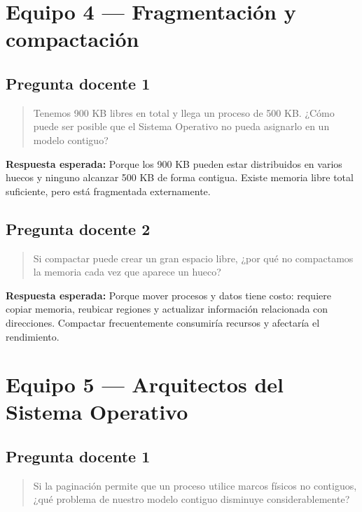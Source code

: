 \documentclass[
  spanish,
  letterpaper,
]{scrbook}
\begin{document}
\section{Equipo 4 --- Fragmentación y
compactación}\label{equipo-4-fragmentaciuxf3n-y-compactaciuxf3n-1}

\subsection{Pregunta docente 1}\label{pregunta-docente-1-3}

\begin{quote}
Tenemos 900 KB libres en total y llega un proceso de 500 KB. ¿Cómo puede
ser posible que el Sistema Operativo no pueda asignarlo en un modelo
contiguo?
\end{quote}

\textbf{Respuesta esperada:} Porque los 900 KB pueden estar distribuidos
en varios huecos y ninguno alcanzar 500 KB de forma contigua. Existe
memoria libre total suficiente, pero está fragmentada externamente.

\subsection{Pregunta docente 2}\label{pregunta-docente-2-3}

\begin{quote}
Si compactar puede crear un gran espacio libre, ¿por qué no compactamos
la memoria cada vez que aparece un hueco?
\end{quote}

\textbf{Respuesta esperada:} Porque mover procesos y datos tiene costo:
requiere copiar memoria, reubicar regiones y actualizar información
relacionada con direcciones. Compactar frecuentemente consumiría
recursos y afectaría el rendimiento.

\section{Equipo 5 --- Arquitectos del Sistema
Operativo}\label{equipo-5-arquitectos-del-sistema-operativo-1}

\subsection{Pregunta docente 1}\label{pregunta-docente-1-4}

\begin{quote}
Si la paginación permite que un proceso utilice marcos físicos no
contiguos, ¿qué problema de nuestro modelo contiguo disminuye
considerablemente?
\end{quote}
\end{document}
